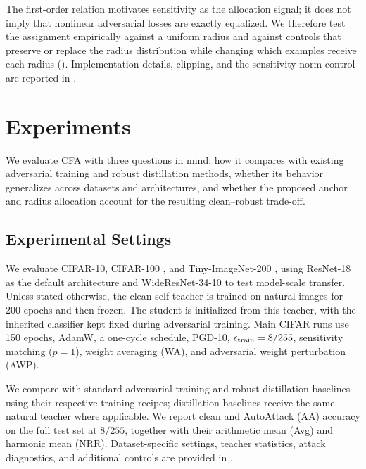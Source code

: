 \documentclass{article} %
\theoremstyle{plain}
\begin{document}
The first-order relation motivates sensitivity as the allocation signal; it
does not imply that nonlinear adversarial losses are exactly equalized. We
therefore test the assignment empirically against a uniform radius and against
controls that preserve or replace the radius distribution while changing
which examples receive each radius (). Implementation
details, clipping, and the sensitivity-norm control are reported in
.

\section{Experiments}
\label{sec:exp}

We evaluate CFA with three questions in mind: how it compares with existing adversarial training and robust distillation methods, whether its behavior generalizes across datasets and architectures, and whether the proposed anchor and radius allocation account for the resulting clean--robust trade-off.

\subsection{Experimental Settings}
We evaluate CIFAR-10, CIFAR-100 \citep{krizhevsky2009learning}, and Tiny-ImageNet-200 \citep{le2015tiny}, using ResNet-18 as the default architecture and WideResNet-34-10 to test model-scale transfer. Unless stated otherwise, the clean self-teacher is trained on natural images for 200 epochs and then frozen. The student is initialized from this teacher, with the inherited classifier kept fixed during adversarial training. Main CIFAR runs use 150 epochs, AdamW, a one-cycle schedule, PGD-10, \(\epsilon_{\rm train}=8/255\), sensitivity matching (\(p=1\)), weight averaging (WA), and adversarial weight perturbation (AWP).

We compare with standard adversarial training and robust distillation baselines using their respective training recipes; distillation baselines receive the same natural teacher where applicable. We report clean and AutoAttack (AA) accuracy on the full test set at \(8/255\), together with their arithmetic mean (Avg) and harmonic mean (NRR). Dataset-specific settings, teacher statistics, attack diagnostics, and additional controls are provided in .
\end{document}
